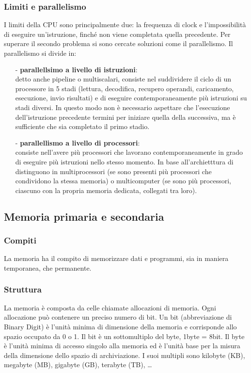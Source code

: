 \documentclass{article}
\begin{document}
\subsubsection*{Limiti e parallelismo}
I limiti della CPU sono principalmente due: la frequenza di clock e l'impossibilità di eseguire un'istruzione, finché
non viene completata quella precedente. Per superare il secondo problema si sono cercate soluzioni come il parallelismo.
Il parallelismo si divide in:
\begin{itemize}[topsep=3pt, itemsep=0pt]
	\item[-] \textbf{parallellsimo a livello di istruzioni}: \\ 
	detto anche pipeline o multiscalari, consiste nel suddividere il ciclo di un processore in 5 stadi (lettura, decodifica,
	recupero operandi, caricamento, esecuzione, invio risultati) e di eseguire contemporaneamente più istruzioni su stadi
	diversi. In questo modo non è necessario aspettare che l'esecuzione dell'istruzione	precedente termini per iniziare
	quella della successiva, ma è sufficiente che sia completato il primo stadio. 
	\item[-] \textbf{parallellismo a livello di processori}: \\
	consiste nell'avere più processori che lavorano contemporaneamente in grado di eseguire più istruzioni nello stesso momento.
	In base all'archietttura di distinguono in multiprocessori (se sono presenti più processori che condividono la stessa memoria)
	o multicomputer (se sono più processori, ciascuno con la propria memoria dedicata, collegati tra loro).
\end{itemize}

\subsection{Memoria primaria e secondaria}
\subsubsection*{Compiti}
La memoria ha il compito di memorizzare dati e programmi, sia in maniera temporanea, che permanente.

\subsubsection*{Struttura}
La memoria è composta da celle chiamate allocazioni di memoria. Ogni allocazione può contenere un preciso numero di bit.
Un bit (abbreviazione di Binary Digit) è l'unità minima di dimensione della memoria e corrisponde allo spazio occupato da 0 o 1.
Il bit è un sottomultiplo del byte, 1byte = 8bit. Il byte è l'unità minima di accesso singolo alla memoria ed è l'unità base 
per la misura della dimensione dello spazio di archiviazione. I suoi multipli sono kilobyte (KB), megabyte (MB), gigabyte (GB),
terabyte (TB), \dots
\end{document}
